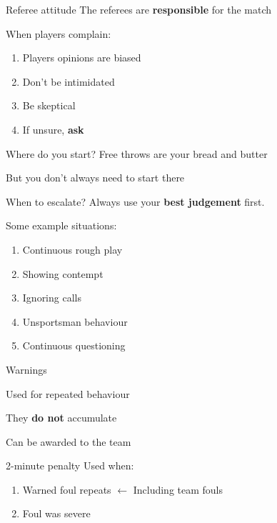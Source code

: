 \begin{frame}{Referee attitude}
    The referees are \textbf{responsible} for the match

    When players complain:

    \begin{enumerate}
        \item Players opinions are biased
        \item Don't be intimidated
        \item Be skeptical
        \item If unsure, \textbf{ask}
    \end{enumerate}
\end{frame}

\begin{frame}{Where do you start?}
    Free throws are your bread and butter

    \pause{}

    But you don't always need to start there
\end{frame}

\begin{frame}{When to escalate?}
    Always use your \textbf{best judgement} first.

    \pause{}

    Some example situations:

    \begin{enumerate}
        \item Continuous rough play
        \item Showing contempt
        \item Ignoring calls
        \item Unsportsman behaviour
        \item Continuous questioning
    \end{enumerate}
\end{frame}

\begin{frame}{Warnings}
    \begin{center}
        Used for repeated behaviour

        They \textbf{do not} accumulate

        Can be awarded to the team
    \end{center}
\end{frame}

\begin{frame}{2-minute penalty}
    Used when:

    \begin{enumerate}
        \item Warned foul repeats $\leftarrow$ Including team fouls
        \item Foul was severe
    \end{enumerate}
\end{frame}

